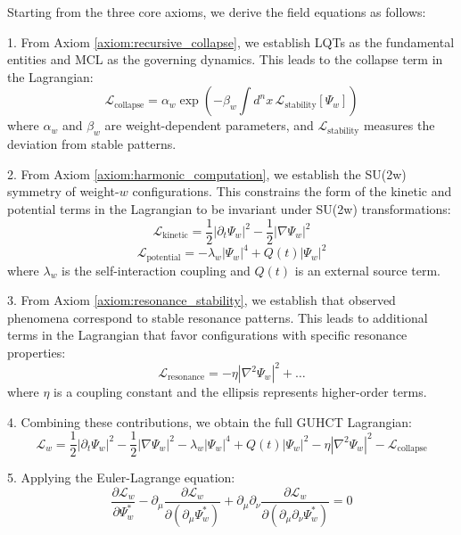 \documentclass[11pt,a4paper]{article}
\makeatletter
\renewenvironment{proof}[1][\proofname]{\par
  \pushQED{\qed}%
  \normalfont \topsep6\p@\@plus6\p@\relax
  \trivlist
  \item[\hskip\labelsep
        \itshape
    #1\@addpunct{.}]\ignorespaces
}{%
  \popQED\endtrivlist\@endpefalse
}
\makeatother
\begin{document}
\begin{proof}
Starting from the three core axioms, we derive the field equations as follows:

1. From Axiom \ref{axiom:recursive_collapse}, we establish LQTs as the fundamental entities and MCL as the governing dynamics. This leads to the collapse term in the Lagrangian:
   \begin{equation}
   \mathcal{L}_{\text{collapse}} = \alpha_w \exp\left(-\beta_w \int d^nx \, \mathcal{L}_{\text{stability}}[\Psi_w]\right)
   \end{equation}
   where $\alpha_w$ and $\beta_w$ are weight-dependent parameters, and $\mathcal{L}_{\text{stability}}$ measures the deviation from stable patterns.

2. From Axiom \ref{axiom:harmonic_computation}, we establish the SU(2w) symmetry of weight-$w$ configurations. This constrains the form of the kinetic and potential terms in the Lagrangian to be invariant under SU(2w) transformations:
   \begin{equation}
   \mathcal{L}_{\text{kinetic}} = \frac{1}{2}|\partial_t\Psi_w|^2 - \frac{1}{2}|\nabla\Psi_w|^2
   \end{equation}
   \begin{equation}
   \mathcal{L}_{\text{potential}} = -\lambda_w|\Psi_w|^4 + Q(t)|\Psi_w|^2
   \end{equation}
   where $\lambda_w$ is the self-interaction coupling and $Q(t)$ is an external source term.

3. From Axiom \ref{axiom:resonance_stability}, we establish that observed phenomena correspond to stable resonance patterns. This leads to additional terms in the Lagrangian that favor configurations with specific resonance properties:
   \begin{equation}
   \mathcal{L}_{\text{resonance}} = -\eta|\nabla^2\Psi_w|^2 + \ldots
   \end{equation}
   where $\eta$ is a coupling constant and the ellipsis represents higher-order terms.

4. Combining these contributions, we obtain the full GUHCT Lagrangian:
   \begin{equation}
   \mathcal{L}_w = \frac{1}{2}|\partial_t\Psi_w|^2 - \frac{1}{2}|\nabla\Psi_w|^2 - \lambda_w|\Psi_w|^4 + Q(t)|\Psi_w|^2 - \eta|\nabla^2\Psi_w|^2 - \mathcal{L}_{\text{collapse}}
   \end{equation}

5. Applying the Euler-Lagrange equation:
   \begin{equation}
   \frac{\partial \mathcal{L}_w}{\partial \Psi_w^*} - \partial_\mu \frac{\partial \mathcal{L}_w}{\partial(\partial_\mu \Psi_w^*)} + \partial_\mu \partial_\nu \frac{\partial \mathcal{L}_w}{\partial(\partial_\mu \partial_\nu \Psi_w^*)} = 0
   \end{equation}


\end{proof}
\end{document}
